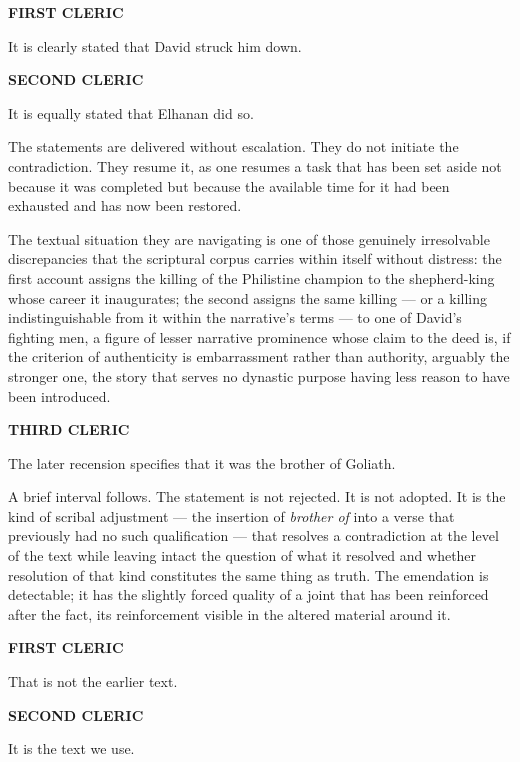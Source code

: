 \documentclass[12pt, oneside]{article}
\newenvironment{action}{%
  \vspace{0.6em}%
  \noindent\ignorespaces%
}{%
  \par\vspace{0.6em}%
}
\newcommand{\character}[1]{%
  \vspace{0.8em}%
  \begin{center}%
    \bfseries\MakeUppercase{#1}%
  \end{center}%
  \vspace{-0.3em}%
}
\newenvironment{dialogue}{%
  \vspace{0.2em}%
  \begin{list}{}{%
    \setlength{\leftmargin}{1.2in}%
    \setlength{\rightmargin}{0.8in}%
    \setlength{\itemsep}{0.6em}%
    \setlength{\parsep}{0pt}%
  }%
}{%
  \end{list}%
  \vspace{0.4em}%
}
\newcommand{\says}[2]{%
  \character{#1}%
  \begin{dialogue}\item #2\end{dialogue}%
}
\begin{document}
\says{First Cleric}{It is clearly stated that David struck him down.}

\says{Second Cleric}{It is equally stated that Elhanan did so.}

\begin{action}
The statements are delivered without escalation. They do not initiate the contradiction. They resume it, as one resumes a task that has been set aside not because it was completed but because the available time for it had been exhausted and has now been restored.

The textual situation they are navigating is one of those genuinely irresolvable discrepancies that the scriptural corpus carries within itself without distress: the first account assigns the killing of the Philistine champion to the shepherd-king whose career it inaugurates; the second assigns the same killing --- or a killing indistinguishable from it within the narrative's terms --- to one of David's fighting men, a figure of lesser narrative prominence whose claim to the deed is, if the criterion of authenticity is embarrassment rather than authority, arguably the stronger one, the story that serves no dynastic purpose having less reason to have been introduced.
\end{action}

\says{Third Cleric}{The later recension specifies that it was the brother of Goliath.}

\begin{action}
A brief interval follows. The statement is not rejected. It is not adopted. It is the kind of scribal adjustment --- the insertion of \textit{brother of} into a verse that previously had no such qualification --- that resolves a contradiction at the level of the text while leaving intact the question of what it resolved and whether resolution of that kind constitutes the same thing as truth. The emendation is detectable; it has the slightly forced quality of a joint that has been reinforced after the fact, its reinforcement visible in the altered material around it.
\end{action}

\says{First Cleric}{That is not the earlier text.}

\says{Second Cleric}{It is the text we use.}
\end{document}

